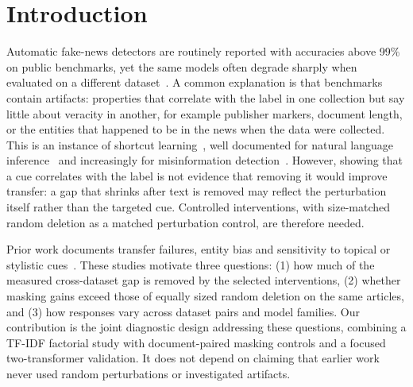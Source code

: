 \section{Introduction}
Automatic fake-news detectors are routinely reported with accuracies above 99\% on public benchmarks, yet the same models often degrade sharply when evaluated on a different dataset~\cite{janicka2019cross,hoy2022generalisability,delloglio2026comparison}. A common explanation is that benchmarks contain artifacts: properties that correlate with the label in one collection but say little about veracity in another, for example publisher markers, document length, or the entities that happened to be in the news when the data were collected. This is an instance of shortcut learning~\cite{geirhos2020shortcut}, well documented for natural language inference~\cite{gururangan2018annotation,poliak2018hypothesis,mccoy2019right} and increasingly for misinformation detection~\cite{verma2026accuracy,wan2025truth,xiao2023sok,haroon2026benchmarks}. However, showing that a cue correlates with the label is not evidence that removing it would improve transfer: a gap that shrinks after text is removed may reflect the perturbation itself rather than the targeted cue. Controlled interventions, with size-matched random deletion as a matched perturbation control, are therefore needed.

Prior work documents transfer failures, entity bias and sensitivity to topical or stylistic cues~\cite{delloglio2026comparison,zhu2022endef,murayama2021diachronic,wan2025truth}. These studies motivate three questions: (1) how much of the measured cross-dataset gap is removed by the selected interventions, (2) whether masking gains exceed those of equally sized random deletion on the same articles, and (3) how responses vary across dataset pairs and model families. Our contribution is the joint diagnostic design addressing these questions, combining a TF-IDF factorial study with document-paired masking controls and a focused two-transformer validation. It does not depend on claiming that earlier work never used random perturbations or investigated artifacts.

